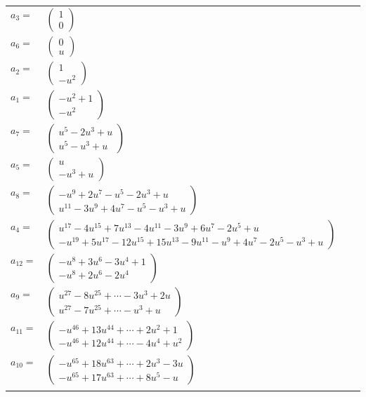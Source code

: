 \documentclass[1p]{elsarticle_modified}
\theoremstyle{definition}
\begin{document}
\begin{tabular}{m{7pt} m{180pt} m{7pt} m{180pt} }
\flushright $a_{3}=$&$\begin{pmatrix}1\\0\end{pmatrix}$ \\
\flushright $a_{6}=$&$\begin{pmatrix}0\\u\end{pmatrix}$ \\
\flushright $a_{2}=$&$\begin{pmatrix}1\\- u^2\end{pmatrix}$ \\
\flushright $a_{1}=$&$\begin{pmatrix}- u^2+1\\- u^2\end{pmatrix}$ \\
\flushright $a_{7}=$&$\begin{pmatrix}u^5-2 u^3+u\\u^5- u^3+u\end{pmatrix}$ \\
\flushright $a_{5}=$&$\begin{pmatrix}u\\- u^3+u\end{pmatrix}$ \\
\flushright $a_{8}=$&$\begin{pmatrix}- u^9+2 u^7- u^5-2 u^3+u\\u^{11}-3 u^9+4 u^7- u^5- u^3+u\end{pmatrix}$ \\
\flushright $a_{4}=$&$\begin{pmatrix}u^{17}-4 u^{15}+7 u^{13}-4 u^{11}-3 u^9+6 u^7-2 u^5+u\\- u^{19}+5 u^{17}-12 u^{15}+15 u^{13}-9 u^{11}- u^9+4 u^7-2 u^5- u^3+u\end{pmatrix}$ \\
\flushright $a_{12}=$&$\begin{pmatrix}- u^8+3 u^6-3 u^4+1\\- u^8+2 u^6-2 u^4\end{pmatrix}$ \\
\flushright $a_{9}=$&$\begin{pmatrix}u^{27}-8 u^{25}+\cdots-3 u^3+2 u\\u^{27}-7 u^{25}+\cdots- u^3+u\end{pmatrix}$ \\
\flushright $a_{11}=$&$\begin{pmatrix}- u^{46}+13 u^{44}+\cdots+2 u^2+1\\- u^{46}+12 u^{44}+\cdots-4 u^4+u^2\end{pmatrix}$ \\
\flushright $a_{10}=$&$\begin{pmatrix}- u^{65}+18 u^{63}+\cdots+2 u^3-3 u\\- u^{65}+17 u^{63}+\cdots+8 u^5- u\end{pmatrix}$\\&\end{tabular}
\end{document}
